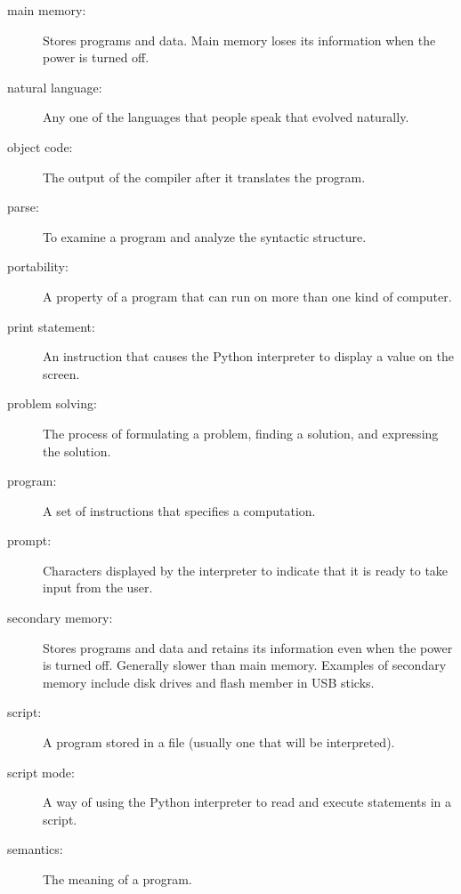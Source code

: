 \documentclass[10pt]{book}
\begin{document}
\begin{description}
\item[main memory:] Stores programs and data.  Main memory loses 
its information when the power is turned off.

\item[natural language:]  Any one of the languages that people speak that
evolved naturally.

\item[object code:]  The output of the compiler after it translates
the program.

\item[parse:]  To examine a program and analyze the syntactic structure.

\item[portability:]  A property of a program that can run on more
than one kind of computer.

\item[print statement:]  An instruction that causes the Python
interpreter to display a value on the screen.

\item[problem solving:]  The process of formulating a problem, finding
a solution, and expressing the solution.

\item[program:] A set of instructions that specifies a computation.

\item[prompt:] Characters displayed by the interpreter to indicate
that it is ready to take input from the user.

\item[secondary memory:] Stores programs and data and retains its 
information even when the power is turned off.  Generally slower 
than main memory.  Examples of secondary memory include disk 
drives and flash member in USB sticks.

\item[script:] A program stored in a file (usually one that will be
interpreted).

\item[script mode:] A way of using the Python interpreter to read
and execute statements in a script.

\item[semantics:]  The meaning of a program.


\end{description}
\end{document}
